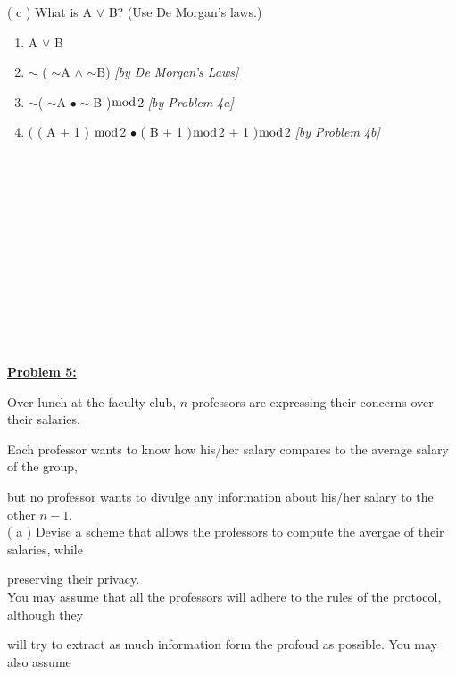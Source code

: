\documentclass[11pt]{article}
\begin{document}
	( c ) What is A $\vee$ B? (Use De Morgan's laws.)\\
	\begin{enumerate}
		\item A $\vee$ B
		\item $\sim$ ( $\sim$A $\wedge$ $\sim$B) \textit{[by De Morgan's Laws]}
		\item $\sim$( $\sim$A $\bullet\sim$B )$\bmod$2  \textit{[by Problem 4a]}
		\item ( ( A + 1 ) $\bmod$2 $\bullet$ ( B + 1 )$\bmod$2 + 1 )$\bmod$2 \textit{[by Problem 4b]}
	\end{enumerate}
\   \\\\\\\\\\\\\\\\\\\\\\\\
	\noindent\textbf{\underline{Problem 5:}}

	Over lunch at the faculty club, $n$ professors are expressing their concerns over their salaries. 

	Each professor wants to know how his/her salary compares to the average salary of the group,

	but no professor wants to divulge any information about his/her salary to the other $n - 1$.\\

	( a ) Devise a scheme that allows the professors to compute the avergae of their salaries, while
	
	preserving their privacy.\\

	You may assume that all the professors will adhere to the rules of the protocol, although they 

	will try to extract as much information form the profoud as possible. You may also assume 
\end{document}
